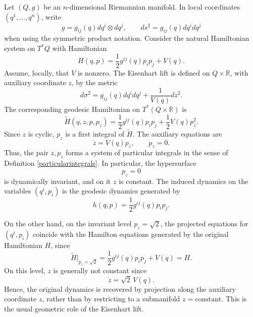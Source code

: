 \documentclass[10pt,a4paper]{article}
\begin{document}
Let \((Q,g)\) be an \(n\)-dimensional Riemannian manifold. In local coordinates \((q^1,\ldots,q^n)\), write
\[
g=g_{ij}(q)dq^i\otimes dq^j,
\qquad
ds^2=g_{ij}(q)dq^idq^j
\]
when using the symmetric product notation. Consider the natural Hamiltonian system on \(T^*Q\) with Hamiltonian
\begin{equation*}
H(q,p)
=
\frac{1}{2}g^{ij}(q)p_ip_j+V(q).
\end{equation*}
Assume, locally, that \(V\) is nonzero. The Eisenhart lift is defined on \(Q\times\mathbb R\), with auxiliary coordinate \(z\), by the metric
\begin{equation*}
d\sigma^2
=
g_{ij}(q)dq^idq^j+\frac{1}{V(q)}dz^2.
\end{equation*}
The corresponding geodesic Hamiltonian on \(T^*(Q\times\mathbb R)\) is
\begin{equation*}
\widetilde H(q,z,p,p_z)
=
\frac{1}{2}g^{ij}(q)p_ip_j
+
\frac{1}{2}V(q)p_z^2.
\end{equation*}
Since \(z\) is cyclic, \(p_z\) is a first integral of \(\widetilde H\). The auxiliary equations are
\begin{equation*}
\dot z=V(q)p_z,
\qquad
\dot p_z=0.
\end{equation*}
Thus, the pair \(z,p_z\) forms a system of particular integrals in the sense of Definition \ref{particularintegrals}. In particular, the hypersurface
\[
p_z=0
\]
is dynamically invariant, and on it \(z\) is constant. The induced dynamics on the variables \((q^i,p_i)\) is the geodesic dynamics generated by
\begin{equation*}
h(q,p)
=
\frac{1}{2}g^{ij}(q)p_ip_j.
\end{equation*}

On the other hand, on the invariant level \(p_z=\sqrt{2}\), the projected equations for \((q^i,p_i)\) coincide with the Hamilton equations generated by the original Hamiltonian \(H\), since
\[
\widetilde H|_{p_z=\sqrt{2}}
=
\frac{1}{2}g^{ij}(q)p_ip_j+V(q)
=
H.
\]
On this level, \(z\) is generally not constant since
\[
\dot z=\sqrt{2}\,V(q).
\]
Hence, the original dynamics is recovered by projection along the auxiliary coordinate \(z\), rather than by restricting to a submanifold \(z=\mathrm{constant}\). This is the usual geometric role of the Eisenhart lift.
\end{document}
